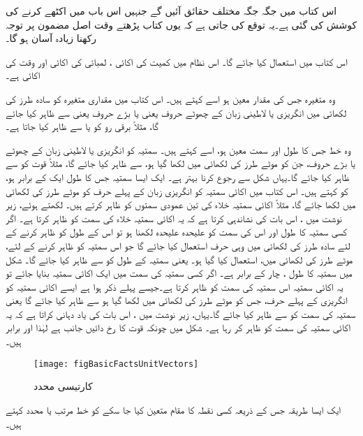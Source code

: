 اس کتاب میں جگہ جگہ مختلف حقائق آئیں گے جنہیں اس باب میں اکٹھے کرنے کی کوشش کی گئی ہے۔یہ توقع کی جاتی ہے کہ یوں کتاب پڑھتے وقت اصل مضمون پر توجہ رکھنا زیادہ آسان ہو گا۔

اس کتاب میں   استعمال کیا جائے گا۔ اس نظام میں کمیت کی اکائی ،  لمبائی کی اکائی  اور وقت کی اکائی  ہے۔

وہ متغیرہ جس کی مقدار معین ہو اسے  کہتے ہیں۔ اس کتاب میں مقداری متغیرہ کو سادہ طرز کی لکھائی میں انگریزی یا لاطینی زبان کے چھوٹے حروف  یعنی   یا بڑے حروف یعنی   سے ظاہر کیا جائے گا، مثلاً برقی رو کو  یا  سے ظاہر کیا جاتا ہے۔

	وہ خط جس کا طول اور سمت معین ہو، اسے  کہتے ہیں۔ سمتیہ کو انگریزی یا لاطینی زبان کے چھوٹے یا  بڑے حروف،  جن کو موٹے طرز کی لکھائی میں لکھا گیا ہو،  سے ظاہر کیا جائے گا، مثلاً قوت کو  سے ظاہر کیا جائے گا۔یہاں شکل   سے رجوع کرنا بہتر ہے۔ ایک ایسا سمتیہ جس کا طول ایک کے برابر ہو،  کو  کہتے ہیں۔ اس کتاب میں اکائی سمتیہ کو انگریزی زبان کے پہلے حرف کو موٹے طرز کی لکھائی میں لکھا جائے گا، مثلاً اکائی سمتیہ  خلاء کی تین عمودی سمتوں کو ظاہر کرتے ہیں۔ لکھتے ہوئے، زیر نوشت میں ، اس بات کی نشاندہی  کرتا ہے کہ یہ اکائی سمتیہ خلاء کی  سمت کو ظاہر کرتا ہے۔ اگر کسی سمتیہ  کا طول اور اس کی سمت کو علیحدہ علیحدہ لکھنا ہو تو اس کے طول کو ظاہر کرنے کے لئے سادہ طرز کی لکھائی میں وہی حرف استعمال کیا جائے گا جو اس سمتیہ کو ظاہر کرنے کے لئے، موٹے طرز کی لکھائی میں، استعمال کیا گیا ہو۔ یعنی سمتیہ  کے طول کو  سے ظاہر کیا جائے گا۔ شکل میں سمتیہ   کا طول ، چار کے برابر ہے۔ اگر کسی سمتیہ کی سمت میں ایک اکائی سمتیہ بنایا جائے تو یہ اکائی سمتیہ اس سمتیہ کی سمت کو ظاہر کرتا ہے۔جیسے پہلے ذکر ہوا ہے  ایسے اکائی سمتیہ کو انگریزی کے پہلے حرف،  جس کو موٹے طرز کی لکھائی میں لکھا گیا ہو  سے ظاہر کیا جائے گا یعنی سمتیہ  کی سمت کو  سے ظاہر کیا جائے گا۔یہاں،  زیر نوشت میں  ، اس بات کی یاد دہانی کراتا ہے کہ یہ اکائی سمتیہ  کی سمت کو ظاہر کر رہا ہے۔ شکل میں چونکہ قوت  کا رخ دائیں جانب ہے لہٰذا   اور   برابر ہیں۔
\begin{figure}
\centering
\texttt{[image: figBasicFactsUnitVectors]}
\caption{کارتیسی محدد}
\label{شکل_حقائق_اکائی_سمتیہ}
\end{figure}
%
ایک ایسا طریقہ جس کے ذریعہ کسی نقطہ کا مقام متعین کیا جا سکے کو خط مرتب یا محدد کہتے ہیں۔

